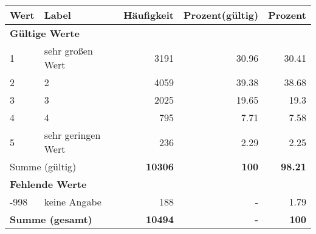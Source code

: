      \begin{longtable}{lXrrr}
     \toprule
     \textbf{Wert} & \textbf{Label} & \textbf{Häufigkeit} & \textbf{Prozent(gültig)} & \textbf{Prozent} \\
     \endhead
     \midrule
     \multicolumn{5}{l}{\textbf{Gültige Werte}}\\

     1 &
     \multicolumn{1}{X}{ sehr großen Wert   } &


       \num{3191} &
       \num[round-mode=places,round-precision=2]{30.96} &
         \num[round-mode=places,round-precision=2]{30.41} \\

     2 &
     \multicolumn{1}{X}{ 2   } &


       \num{4059} &
       \num[round-mode=places,round-precision=2]{39.38} &
         \num[round-mode=places,round-precision=2]{38.68} \\

     3 &
     \multicolumn{1}{X}{ 3   } &


       \num{2025} &
       \num[round-mode=places,round-precision=2]{19.65} &
         \num[round-mode=places,round-precision=2]{19.3} \\

     4 &
     \multicolumn{1}{X}{ 4   } &


       \num{795} &
       \num[round-mode=places,round-precision=2]{7.71} &
         \num[round-mode=places,round-precision=2]{7.58} \\

     5 &
     \multicolumn{1}{X}{ sehr geringen Wert   } &


       \num{236} &
       \num[round-mode=places,round-precision=2]{2.29} &
         \num[round-mode=places,round-precision=2]{2.25} \\
     \midrule
     \multicolumn{2}{l}{Summe (gültig)} &
       \textbf{\num{10306}} &
     \textbf{\num{100}} &
       \textbf{\num[round-mode=places,round-precision=2]{98.21}} \\
     \multicolumn{5}{l}{\textbf{Fehlende Werte}}\\
       -998 &
       keine Angabe &
         \num{188} &
        - &
         \num[round-mode=places,round-precision=2]{1.79} \\
     \midrule
     \multicolumn{2}{l}{\textbf{Summe (gesamt)}} &
          \textbf{\num{10494}} &
        \textbf{-} &
        \textbf{\num{100}} \\
     \bottomrule
     \end{longtable}
     
